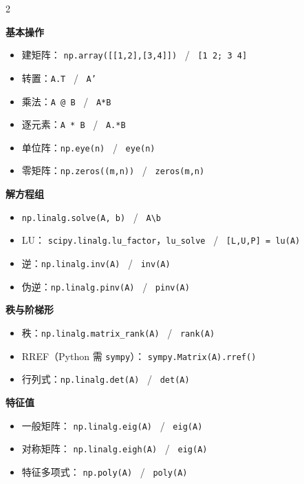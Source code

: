 \documentclass[11pt,a4paper,openany]{ctexbook}
\newcommand{\minihead}[1]{%
  \par\addvspace{8pt}%
  {\noindent\sffamily\bfseries\large\color{qing} #1\par}%
  \vspace{-4pt}\noindent{\color{qing!28}\rule{\linewidth}{0.6pt}}\par\vspace{5pt}}
\begin{document}
\begin{multicols}{2}
\small\sloppy
{}

\minihead{基本操作}
\begin{itemize}[leftmargin=1.4em, itemsep=2pt]
\item 建矩阵：
      \texttt{np.array([[1,2],[3,4]])} \ / \ \texttt{[1 2; 3 4]}
\item 转置：\texttt{A.T} \ / \ \texttt{A'}
\item 乘法：\texttt{A @ B} \ / \ \texttt{A*B}
\item 逐元素：\texttt{A * B} \ / \ \texttt{A.*B}
\item 单位阵：\texttt{np.eye(n)} \ / \ \texttt{eye(n)}
\item 零矩阵：\texttt{np.zeros((m,n))} \ / \ \texttt{zeros(m,n)}
\end{itemize}

\minihead{解方程组}
\begin{itemize}[leftmargin=1.4em, itemsep=2pt]
\item \texttt{np.linalg.solve(A, b)} \ / \ \texttt{A\textbackslash b}
\item LU：
      \texttt{scipy.linalg.lu\_factor}，\texttt{lu\_solve}
      \ / \ \texttt{[L,U,P] = lu(A)}
\item 逆：\texttt{np.linalg.inv(A)} \ / \ \texttt{inv(A)}
\item 伪逆：\texttt{np.linalg.pinv(A)} \ / \ \texttt{pinv(A)}
\end{itemize}

\minihead{秩与阶梯形}
\begin{itemize}[leftmargin=1.4em, itemsep=2pt]
\item 秩：\texttt{np.linalg.matrix\_rank(A)} \ / \ \texttt{rank(A)}
\item RREF（Python 需 \texttt{sympy}）：
      \texttt{sympy.Matrix(A).rref()}
\item 行列式：\texttt{np.linalg.det(A)} \ / \ \texttt{det(A)}
\end{itemize}

\minihead{特征值}
\begin{itemize}[leftmargin=1.4em, itemsep=2pt]
\item 一般矩阵：
      \texttt{np.linalg.eig(A)} \ / \ \texttt{eig(A)}
\item 对称矩阵：
      \texttt{np.linalg.eigh(A)} \ / \ \texttt{eig(A)}
\item 特征多项式：
      \texttt{np.poly(A)} \ / \ \texttt{poly(A)}
\end{itemize}


\end{multicols}
\end{document}
